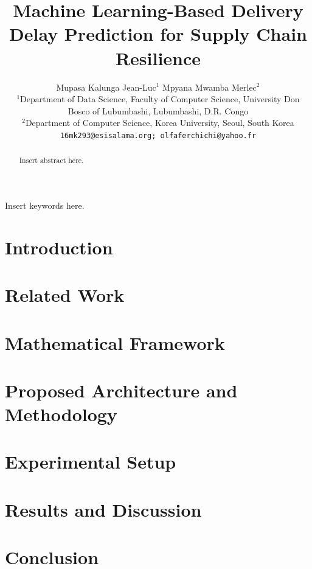 \documentclass[3p,times,procedia]{elsarticle}
\begin{document}
\begin{frontmatter}


\title{Machine Learning-Based Delivery Delay Prediction for Supply Chain Resilience}

\author{%
\begin{tabular}{c}
Mupasa Kalunga Jean-Luc$^{1}$ \qquad Mpyana Mwamba Merlec$^{2}$\\[0.5em]
{\small $^{1}$Department of Data Science, Faculty of Computer Science, University Don Bosco of Lubumbashi, Lubumbashi, D.R. Congo}\\
{\small $^{2}$Department of Computer Science, Korea University, Seoul, South Korea}\\[0.3em]
{\small\texttt{16mk293@esisalama.org; olfaferchichi@yahoo.fr}}
\end{tabular}%
}
\date{} %


\begin{abstract}
Insert abstract here.
\end{abstract}

\begin{keyword}
Insert keywords here.
\end{keyword}

\end{frontmatter}

\section{Introduction}

\section{Related Work}

\section{Mathematical Framework}

\section{Proposed Architecture and Methodology}

\section{Experimental Setup}

\section{Results and Discussion}

\section{Conclusion}

\nocite{*}


\end{document}
